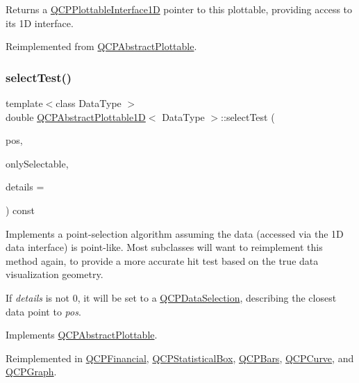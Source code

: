 Returns a \hyperlink{classQCPPlottableInterface1D}{Q\+C\+P\+Plottable\+Interface1D} pointer to this plottable, providing access to its 1D interface.

Reimplemented from \hyperlink{classQCPAbstractPlottable_a81fd9fd5c4f429c074785e2eb238a8e7}{Q\+C\+P\+Abstract\+Plottable}.

\mbox{\label{classQCPAbstractPlottable1D_a4611b43bcb6441b2154eb4f4e0a33db2}} 
\subsubsection{\texorpdfstring{select\+Test()}{selectTest()}}
{\footnotesize\ttfamily template$<$class Data\+Type $>$ \\
double \hyperlink{classQCPAbstractPlottable1D}{Q\+C\+P\+Abstract\+Plottable1D}$<$ Data\+Type $>$\+::select\+Test (\begin{DoxyParamCaption}\item[{const Q\+PointF \&}]{pos,  }\item[{bool}]{only\+Selectable,  }\item[{Q\+Variant $\ast$}]{details = {} }\end{DoxyParamCaption}) const\hspace{0.3cm}{\ttfamily [virtual]}}

Implements a point-\/selection algorithm assuming the data (accessed via the 1D data interface) is point-\/like. Most subclasses will want to reimplement this method again, to provide a more accurate hit test based on the true data visualization geometry.

If {\itshape details} is not 0, it will be set to a \hyperlink{classQCPDataSelection}{Q\+C\+P\+Data\+Selection}, describing the closest data point to {\itshape pos}.

Implements \hyperlink{classQCPAbstractPlottable_addb3f5c41f007a78c3e142cc605bc712}{Q\+C\+P\+Abstract\+Plottable}.



Reimplemented in \hyperlink{classQCPFinancial_aac8e91622ac58330fa9ce81cc8fd40ee}{Q\+C\+P\+Financial}, \hyperlink{classQCPStatisticalBox_a1607fa92f829c631107c20ccb2d70a6d}{Q\+C\+P\+Statistical\+Box}, \hyperlink{classQCPBars_a121f899c27af3186fe93dcd0eb98f49b}{Q\+C\+P\+Bars}, \hyperlink{classQCPCurve_a0ed9b7e6b4bc72010d6fcd974af46a8b}{Q\+C\+P\+Curve}, and \hyperlink{classQCPGraph_a6d669d04462d272c6aa0e5f85846d673}{Q\+C\+P\+Graph}.

